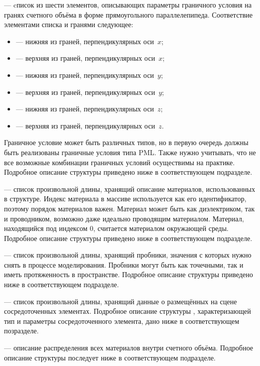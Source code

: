 --- cписок из шести элементов, описывающих параметры
граничного условия на гранях счетного объёма в форме прямоугольного
параллелепипеда. Соответствие элементами списка и гранями следующее:
\begin{itemize}
\item {} --- нижняя из граней, перпендикулярных оси~$x$;
\item {} --- верхняя из граней, перпендикулярных оси~$x$;
\item {} --- нижняя из граней, перпендикулярных оси~$y$;
\item {} --- верхняя из граней, перпендикулярных оси~$y$;
\item {} --- нижняя из граней, перпендикулярных оси~$z$;
\item {} --- верхняя из граней, перпендикулярных оси~$z$.
\end{itemize}
Граничное условие может быть различных типов, но в первую очередь должны быть
реализованы граничные условия типа PML. Также нужно учитывать, что не все
возможные комбинации граничных условий осуществимы на практике. Подробное
описание структуры  приведено ниже в соответствующем подразделе.

 --- список произвольной длины, хранящий описание материалов,
использованных в структуре. Индекс материала в массиве используется как его
идентификатор, поэтому порядок материалов важен. Материал может быть как
диэлектриком, так и проводником, возможно даже идеально проводящим материалом.
Материал, находящийся под индексом 0, считается материалом окружающей среды.
Подробное описание структуры  приведено ниже в соответствующем
подразделе.

 --- список произвольной длины, хранящий пробники, значения
с которых нужно снять в процессе моделирования. Пробники могут быть как
точечными, так и иметь протяженность в пространстве. Подробное описание
структуры  приведено ниже в соответствующем подразделе.

 --- список произвольной длины, хранящий данные о размещённых
на сцене сосредоточенных элементах. Подробное описание структуры ,
характеризающей тип и параметры сосредоточенного элемента, дано ниже
в соответствующем позразделе.

 --- описание распределения всех материалов внутри счетного
объёма. Подробное описание структуры  последует ниже
в соответствующем подразделе.


